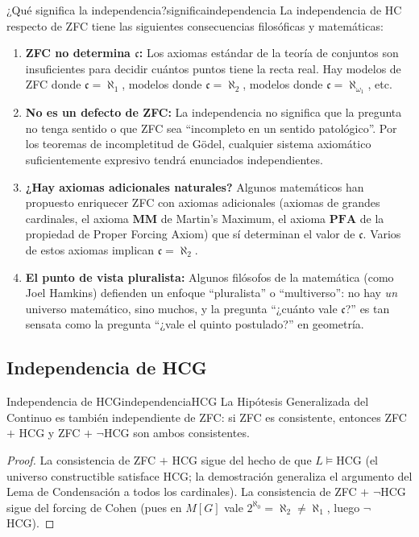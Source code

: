 \begin{observacion}{¿Qué significa la independencia?}{significaindependencia}
La independencia de HC respecto de ZFC tiene las siguientes consecuencias filosóficas y matemáticas:
\begin{enumerate}[leftmargin=2em, label=(\alph*)]
  \item \textbf{ZFC no determina $\mathfrak{c}$:} Los axiomas estándar de la teoría de conjuntos son insuficientes para decidir cuántos puntos tiene la recta real. Hay modelos de ZFC donde $\mathfrak{c} = \aleph_1$, modelos donde $\mathfrak{c} = \aleph_2$, modelos donde $\mathfrak{c} = \aleph_{\omega_1}$, etc.
  \item \textbf{No es un defecto de ZFC:} La independencia no significa que la pregunta no tenga sentido o que ZFC sea ``incompleto en un sentido patológico''. Por los teoremas de incompletitud de Gödel, cualquier sistema axiomático suficientemente expresivo tendrá enunciados independientes.
  \item \textbf{¿Hay axiomas adicionales naturales?} Algunos matemáticos han propuesto enriquecer ZFC con axiomas adicionales (axiomas de grandes cardinales, el axioma $\mathbf{MM}$ de Martin's Maximum, el axioma $\mathbf{PFA}$ de la propiedad de Proper Forcing Axiom) que sí determinan el valor de $\mathfrak{c}$. Varios de estos axiomas implican $\mathfrak{c} = \aleph_2$.
  \item \textbf{El punto de vista pluralista:} Algunos filósofos de la matemática (como Joel Hamkins) defienden un enfoque ``pluralista'' o ``multiverso'': no hay \emph{un} universo matemático, sino muchos, y la pregunta ``¿cuánto vale $\mathfrak{c}$?'' es tan sensata como la pregunta ``¿vale el quinto postulado?'' en geometría.
\end{enumerate}
\end{observacion}

\subsection{Independencia de HCG}

\begin{corolario}{Independencia de HCG}{independenciaHCG}
La Hipótesis Generalizada del Continuo es también independiente de ZFC: si ZFC es consistente, entonces ZFC $+$ HCG y ZFC $+$ $\neg$HCG son ambos consistentes.
\end{corolario}

\begin{proof}
La consistencia de ZFC $+$ HCG sigue del hecho de que $L \models \mathrm{HCG}$ (el universo constructible satisface HCG; la demostración generaliza el argumento del Lema de Condensación a todos los cardinales). La consistencia de ZFC $+$ $\neg$HCG sigue del forcing de Cohen (pues en $M[G]$ vale $2^{\aleph_0} = \aleph_2 \neq \aleph_1$, luego $\neg$HCG).
\end{proof}

